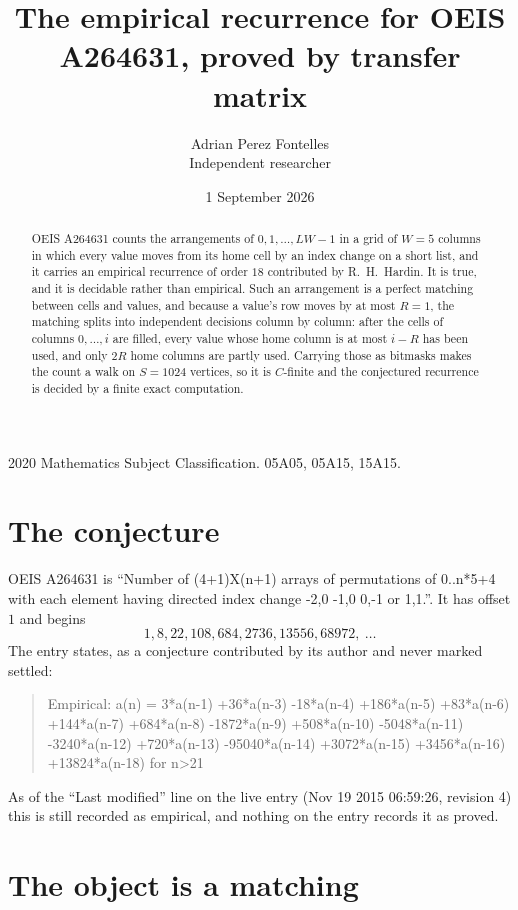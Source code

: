 \documentclass[11pt,a4paper]{article}
\title{The empirical recurrence for OEIS A264631, proved by transfer matrix}
\author{Adrian Perez Fontelles\\ \small Independent researcher}
\date{1 September 2026}
\theoremstyle{plain}
\theoremstyle{definition}
\begin{document}
\maketitle

\begin{abstract}
OEIS A264631 counts the arrangements of $0,1,\dots,LW-1$ in a grid of $W=5$ columns in which
every value moves from its home cell by an index change on a short list, and it carries an
empirical recurrence of order $18$ contributed by R.~H.~Hardin. It is true, and it is
decidable rather than empirical. Such an arrangement is a perfect matching between cells and
values, and because a value's row moves by at most $R=1$, the matching splits into
independent decisions column by column: after the cells of columns $0,\dots,i$ are filled,
every value whose home column is at most $i-R$ has been used, and only $2R$ home columns are
partly used. Carrying those as bitmasks makes the count a walk on $S=1024$ vertices, so it is
$C$-finite and the conjectured recurrence is decided by a finite exact computation.
\end{abstract}

\noindent\small 2020 Mathematics Subject Classification. 05A05, 05A15, 15A15.\normalsize

\section{The conjecture}

OEIS A264631 is ``Number of (4+1)X(n+1) arrays of permutations of 0..n*5+4 with each element having directed index change -2,0 -1,0 0,-1 or 1,1.''. It has offset $1$ and begins
\[
1, 8, 22, 108, 684, 2736, 13556, 68972,\ \dots
\]
The entry states, as a conjecture contributed by its author and never marked settled:
\begin{quote}
Empirical: a(n) = 3*a(n-1) +36*a(n-3) -18*a(n-4) +186*a(n-5) +83*a(n-6) +144*a(n-7) +684*a(n-8) -1872*a(n-9) +508*a(n-10) -5048*a(n-11) -3240*a(n-12) +720*a(n-13) -95040*a(n-14) +3072*a(n-15) +3456*a(n-16) +13824*a(n-18) for n>21
\end{quote}
As of the ``Last modified'' line on the live entry (Nov 19 2015 06:59:26, revision 4) this is still
recorded as empirical, and nothing on the entry records it as proved.

\section{The object is a matching}
\end{document}
